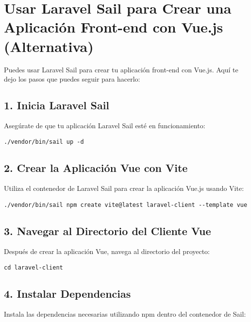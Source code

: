 \documentclass[11pt]{article}
\begin{document}
\section{Usar Laravel Sail para Crear una Aplicación Front-end con Vue.js (Alternativa)}
\label{sec:org9073953}

Puedes usar Laravel Sail para crear tu aplicación front-end con
Vue.js. Aquí te dejo los pasos que puedes seguir para hacerlo:

\subsection{1. Inicia Laravel Sail}
\label{sec:org0790d75}

Asegúrate de que tu aplicación Laravel Sail esté en funcionamiento:

\begin{verbatim}
./vendor/bin/sail up -d
\end{verbatim}

\subsection{2. Crear la Aplicación Vue con Vite}
\label{sec:org1c50d51}

Utiliza el contenedor de Laravel Sail para crear la aplicación Vue.js
usando Vite:

\begin{verbatim}
./vendor/bin/sail npm create vite@latest laravel-client --template vue
\end{verbatim}

\subsection{3. Navegar al Directorio del Cliente Vue}
\label{sec:org08d44e5}

Después de crear la aplicación Vue, navega al directorio del proyecto:

\begin{verbatim}
cd laravel-client
\end{verbatim}

\subsection{4. Instalar Dependencias}
\label{sec:org4df0a3f}

Instala las dependencias necesarias utilizando npm dentro del
contenedor de Sail:
\end{document}
